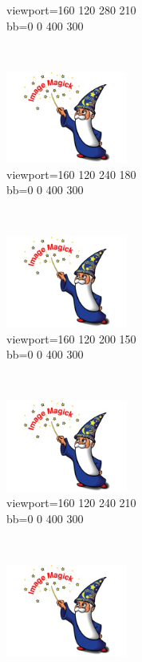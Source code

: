 \documentclass[french]{article}
\begin{document}
\begin{figure}[h]
\begin{subfigure}[b]{0.3\textwidth}
        \caption{viewport=160 120 280 210\\bb=0 0 400 300}%
        \label{essai_d}
    \end{subfigure}
    ~
    \begin{subfigure}[b]{0.3\textwidth}
        \includegraphics[viewport=160 120 240 180,bb=0 0 400 300,width=4cm,height=3cm,clip=true]{test.jpg}
        \caption{viewport=160 120 240 180\\bb=0 0 400 300}%
        \label{essai_e}
    \end{subfigure}
    ~
    \begin{subfigure}[b]{0.3\textwidth}
        \includegraphics[viewport=160 120 200 150,bb=0 0 400 300,width=4cm,height=3cm,clip=true]{test.jpg}
        \caption{viewport=160 120 200 150\\bb=0 0 400 300}%
        \label{essai_f}
    \end{subfigure}
    \\
    \begin{subfigure}[b]{0.3\textwidth}
        \includegraphics[viewport=160 120 240 210,bb=0 0 400 300,width=4cm,height=3cm,clip=true]{test.jpg}
        \caption{viewport=160 120 240 210\\bb=0 0 400 300}%
        \label{essai_g}
    \end{subfigure}
    ~
    \begin{subfigure}[b]{0.3\textwidth}
        \includegraphics[viewport=160 120 240 180,bb=0 0 400 300,width=4cm,height=3cm,clip=true]{test.jpg}

\end{subfigure}
\end{figure}
\end{document}
